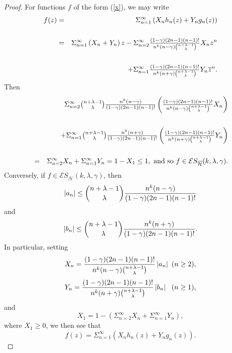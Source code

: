 \documentclass[12pt,reqno]{amsart}
\begin{document}
\begin{proof}
For functions $f$ of the form (\ref{x}), we may write 
\begin{eqnarray*}
f(z) &=&\Sigma_{n=1}^{\infty}\left(
X_{n}h_{n}(z)+Y_{n}g_{n}(z)\right) \\
&& \\
&=&\Sigma_{n=1}^{\infty}\left( X_{n}+Y_{n}\right) z-%
\Sigma_{n=2}^{\infty}\tfrac{(1-\gamma )(2n-1)(n-1)!}{%
n^{k}(n-\gamma )\binom{n+\lambda -1}{\lambda }}X_{n}z^{n} \\
&& \\
&&+\Sigma_{n=1}^{\infty}\tfrac{(1-\gamma )(2n-1)(n-1)!}{%
n^{k}(n+\gamma )\binom{n+\lambda -1}{\lambda }}Y_{n}\overline{z}^{n}.
\end{eqnarray*}%
Then%
\begin{eqnarray*}
&&\Sigma_{n=2}^{\infty}\tbinom{n+\lambda -1}{\lambda }%
\tfrac{n^{k}(n-\gamma )}{(1-\gamma )(2n-1)(n-1)!}\left( \tfrac{(1-\gamma
)(2n-1)(n-1)!}{n^{k}(n-\gamma )\binom{n+\lambda -1}{\lambda }}X_{n}\right) \\
&& \\
&&+\Sigma_{n=1}^{\infty}\tbinom{n+\lambda -1}{\lambda }%
\tfrac{n^{k}(n+\gamma )}{(1-\gamma )(2n-1)(n-1)!}\left( \tfrac{(1-\gamma
)(2n-1)(n-1)!}{n^{k}(n+\gamma )\binom{n+\lambda -1}{\lambda }}Y_{n}\right) \\
&& \\
&=&\Sigma_{n=2}^{\infty}X_{n}+\Sigma_{n=1}^{\infty}Y_{n}=1-X_{1}\leq 1,\text{ and so }f\in \mathcal{E}S_{\overline{%
\mathcal{H}}}(k,\lambda ,\gamma ).
\end{eqnarray*}
Conversely, if $f\in \mathcal{E}S_{\overline{\mathcal{H}}}(k,\lambda ,\gamma
)$, then
\begin{equation*}
\left\vert a_{n}\right\vert \leq \binom{n+\lambda -1}{\lambda }\dfrac{%
n^{k}(n-\gamma )}{(1-\gamma )(2n-1)(n-1)!}
\end{equation*}%
and 
\begin{equation*}
\left\vert b_{n}\right\vert \leq \binom{n+\lambda -1}{\lambda }\dfrac{%
n^{k}(n+\gamma )}{(1-\gamma )(2n-1)(n-1)!}.
\end{equation*}%
In particular, setting 
\begin{equation*}
X_{n}=\frac{(1-\gamma )(2n-1)(n-1)!}{n^{k}(n-\gamma )\binom{n+\lambda -1}{%
\lambda }}\left\vert a_{n}\right\vert \text{ }(n\geq 2),
\end{equation*}%
\begin{equation*}
Y_{n}=\frac{(1-\gamma )(2n-1)(n-1)!}{n^{k}(n+\gamma )\binom{n+\lambda -1}{%
\lambda }}\left\vert b_{n}\right\vert \ \ (n\geq 1),
\end{equation*}%
and 
\begin{equation*}
X_{1}=1-\left( \Sigma_{n=2}^{\infty}X_{n}+\Sigma_{n=1}^{\infty}Y_{n}\right) ,
\end{equation*}%
where $X_{1}\geq 0$, we then see that%
\begin{equation*}
f(z)=\Sigma_{n=1}^{\infty }\left( X_{n}h_{n}(z)+Y_{n}g_{n}(z)\right) .
\end{equation*}
\end{proof}
\end{document}
